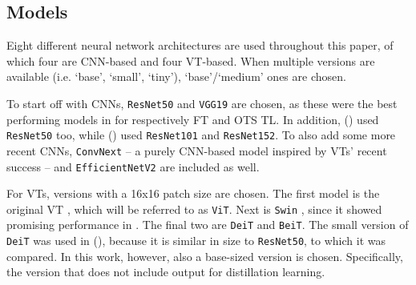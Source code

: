 
\subsection{Models} \label{methods:models}
Eight different neural network architectures are used throughout this paper, of which four are CNN-based and four VT-based. When multiple versions are available (i.e. `base', `small', `tiny'), `base'/`medium' ones are chosen.

To start off with CNNs, \texttt{ResNet50} \citep{he2016deep} and \texttt{VGG19} \citep{simonyan2014very} are chosen, as these were the best performing models in \citeauthor{sabatelli2018deep} for respectively FT and OTS TL. In addition, \citeauthor{matsoukas2021time} (\citeyear{matsoukas2021time}) used \texttt{ResNet50} too, while \citeauthor{zhou2021convnets} (\citeyear{zhou2021convnets}) used \texttt{ResNet101} and \texttt{ResNet152}. To also add some more recent CNNs, \texttt{ConvNext} \citep{liu2022convnet} -- a purely CNN-based model inspired by VTs' recent success -- and \texttt{EfficientNetV2} \citep{tan2021efficientnetv2} are included as well.

For VTs, versions with a 16x16 patch size are chosen. The first model is the original VT \citep{dosovitskiy2020image}, which will be referred to as \texttt{ViT}. Next is \texttt{Swin} \citep{liu2021swin}, since it showed promising performance in \citeauthor{zhou2021convnets}. The final two are \texttt{DeiT} and \texttt{BeiT}. The small version of \texttt{DeiT} was used in \citeauthor{matsoukas2021time} (\citeyear{matsoukas2021time}), because it is similar in size to \texttt{ResNet50}, to which it was compared. In this work, however, also a base-sized version is chosen. Specifically, the version that does not include output for distillation learning.


